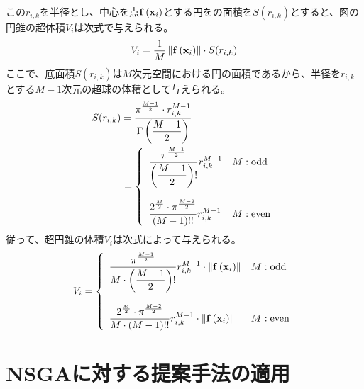 \documentclass[10pt, a4paper, titlepage]{jarticle}
\begin{document}
この$r_{i,k}$を半径とし、中心を点${\bf f}\left( {\bf x}_i \right)$とする円をの面積を$S(r_{i,k})$とすると、図の円錐の超体積$V_i$は次式で与えられる。
\begin{equation}
V_i = \frac{1}{M} \left\| {\bf f}\left( {\bf x}_i \right) \right\| \cdot S(r_{i,k})
\end{equation}
ここで、底面積$S(r_{i,k})$は$M$次元空間における円の面積であるから、半径を$r_{i,k}$とする$M-1$次元の超球の体積として与えられる。
\begin{eqnarray}
S(r_{i,k}) 
= \frac{ \displaystyle\pi^\frac{M-1}{2}\cdot r_{i,k}^{M-1} }{ \displaystyle\Gamma\left( \frac{M+1}{2} \right) }
\hspace{30mm}\\
= \left\{
\begin{array}{ll}
\displaystyle\frac{ \displaystyle\pi^{\frac{M-1}{2}} }{ \displaystyle\left( \frac{M-1}{2} \right)! } r_{i,k}^{M-1} & M:{\rm odd}\\
\\
\displaystyle\frac{\displaystyle2^{\frac{M}{2}}\cdot \displaystyle\pi^{\frac{M-2}{2}}}{\left( M-1 \right)!!} r_{i,k}^{M-1} & M:{\rm even}
\end{array}
\right.
\end{eqnarray}
従って、超円錐の体積$V_i$は次式によって与えられる。
\begin{equation}
V_i = 
\left\{
\begin{array}{ll}
\displaystyle\frac{ \displaystyle\pi^{\frac{M-1}{2}} }{ M\cdot\displaystyle\left( \frac{M-1}{2} \right)! } r_{i,k}^{M-1} \cdot\left\| {\bf f}\left( {\bf x}_i \right) \right\| & M:{\rm odd}\\
\\
\displaystyle\frac{\displaystyle2^{\frac{M}{2}}\cdot \displaystyle\pi^{\frac{M-2}{2}}}{M\cdot\left( M-1 \right)!!} r_{i,k}^{M-1} \cdot\left\| {\bf f}\left( {\bf x}_i \right) \right\| & M:{\rm even}
\end{array}
\right.
\end{equation}


\newpage
\section{NSGAに対する提案手法の適用}
\end{document}
